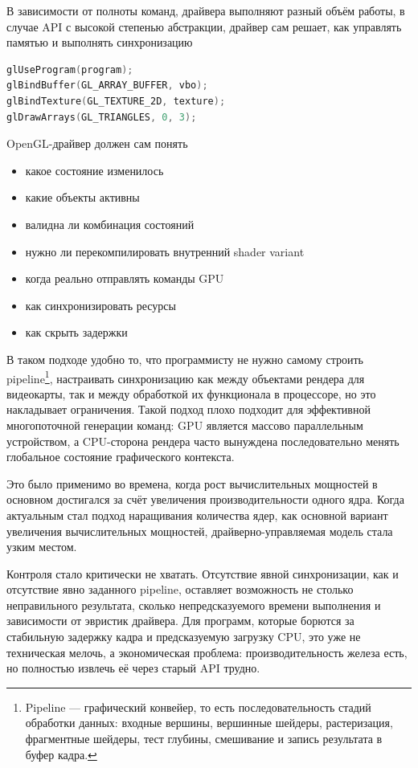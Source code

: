 \documentclass[12pt,a4paper]{article}
\begin{document}
В зависимости от полноты команд, драйвера
выполняют разный объём работы, в случае API с высокой степенью абстракции, драйвер
сам решает, как управлять памятью и выполнять синхронизацию

\begin{lstlisting}[language=C++, title={\textbf{Пример инициализации рендера для OpenGL}}]
glUseProgram(program);
glBindBuffer(GL_ARRAY_BUFFER, vbo);
glBindTexture(GL_TEXTURE_2D, texture);
glDrawArrays(GL_TRIANGLES, 0, 3);
\end{lstlisting}
OpenGL-драйвер должен сам понять
\begin{itemize}
	\item какое состояние изменилось
	\item какие объекты активны
	\item валидна ли комбинация состояний
	\item нужно ли перекомпилировать внутренний shader variant
	\item когда реально отправлять команды GPU
	\item как синхронизировать ресурсы
	\item как скрыть задержки
\end{itemize}

В таком подходе удобно то, что программисту не нужно самому строить pipeline\footnote{
Pipeline — графический конвейер, то есть последовательность стадий обработки данных: входные 
вершины, вершинные шейдеры, растеризация, фрагментные шейдеры, тест глубины, смешивание и запись
результата в буфер кадра.
}, 
настраивать синхронизацию как между объектами рендера для видеокарты, так и между
обработкой их функционала в процессоре, но это накладывает ограничения. Такой подход
плохо подходит для эффективной многопоточной генерации команд: GPU является массово
параллельным устройством, а CPU-сторона рендера часто вынуждена последовательно
менять глобальное состояние графического контекста.

Это было применимо во времена, когда рост вычислительных мощностей в основном
достигался за счёт увеличения производительности одного ядра. Когда актуальным стал
подход наращивания количества ядер, как основной вариант увеличения вычислительных
мощностей, драйверно-управляемая модель стала узким местом.

Контроля стало критически не хватать. Отсутствие явной синхронизации, как и отсутствие
явно заданного pipeline, оставляет возможность не столько неправильного результата, 
сколько непредсказуемого времени выполнения и зависимости от эвристик драйвера.
Для программ, которые борются за стабильную задержку кадра и предсказуемую
загрузку CPU, это уже не техническая мелочь, а экономическая проблема: производительность 
железа есть, но полностью извлечь её через старый API трудно.
\end{document}
